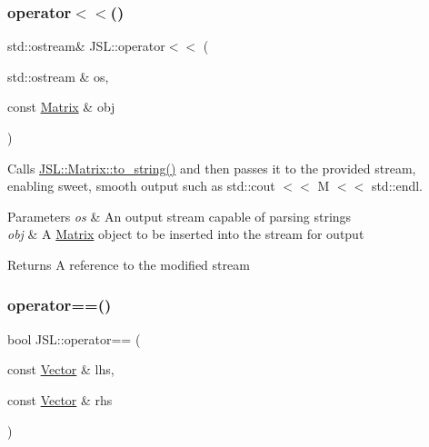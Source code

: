 \subsubsection{\texorpdfstring{operator$<$$<$()}{operator<<()}\hspace{0.1cm}{\footnotesize\ttfamily [2/2]}}
{\footnotesize\ttfamily std\+::ostream\& J\+S\+L\+::operator$<$$<$ (\begin{DoxyParamCaption}\item[{std\+::ostream \&}]{os,  }\item[{const \hyperlink{classJSL_1_1Matrix}{Matrix} \&}]{obj }\end{DoxyParamCaption})\hspace{0.3cm}{\ttfamily [inline]}}



Calls \hyperlink{classJSL_1_1Matrix_abcf44559767ab6939851f0d3b60c6fa8}{J\+S\+L\+::\+Matrix\+::to\+\_\+string()} and then passes it to the provided stream, enabling sweet, smooth output such as std\+::cout $<$$<$ M $<$$<$ std\+::endl. 


\begin{DoxyParams}{Parameters}
{\em os} & An output stream capable of parsing strings \\
\hline
{\em obj} & A \hyperlink{classJSL_1_1Matrix}{Matrix} object to be inserted into the stream for output \\
\hline
\end{DoxyParams}
\begin{DoxyReturn}{Returns}
A reference to the modified stream 
\end{DoxyReturn}
\mbox{\label{namespaceJSL_a7fad54be308ccb76f68933d91c3c542f}} 
\subsubsection{\texorpdfstring{operator==()}{operator==()}\hspace{0.1cm}{\footnotesize\ttfamily [1/2]}}
{\footnotesize\ttfamily bool J\+S\+L\+::operator== (\begin{DoxyParamCaption}\item[{const \hyperlink{classJSL_1_1Vector}{Vector} \&}]{lhs,  }\item[{const \hyperlink{classJSL_1_1Vector}{Vector} \&}]{rhs }\end{DoxyParamCaption})\hspace{0.3cm}{\ttfamily [inline]}}


